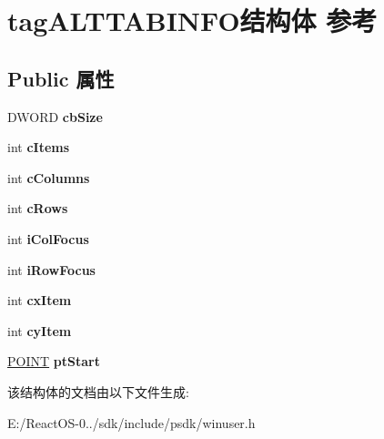 \hypertarget{structtag_a_l_t_t_a_b_i_n_f_o}{}\section{tag\+A\+L\+T\+T\+A\+B\+I\+N\+F\+O结构体 参考}
\label{structtag_a_l_t_t_a_b_i_n_f_o}
\subsection*{Public 属性}
\begin{DoxyCompactItemize}
\item 
\mbox{\label{structtag_a_l_t_t_a_b_i_n_f_o_a15757bfaad41c9460474ffdeecd2b880}} 
D\+W\+O\+RD {\bfseries cb\+Size}
\item 
\mbox{\label{structtag_a_l_t_t_a_b_i_n_f_o_af64a43942f00b733a4ba354e8f5c8d09}} 
int {\bfseries c\+Items}
\item 
\mbox{\label{structtag_a_l_t_t_a_b_i_n_f_o_ac453b47b970fe6569544fc01190fc00d}} 
int {\bfseries c\+Columns}
\item 
\mbox{\label{structtag_a_l_t_t_a_b_i_n_f_o_a4b92607ec1496035b7ec1eb0d0bbde2b}} 
int {\bfseries c\+Rows}
\item 
\mbox{\label{structtag_a_l_t_t_a_b_i_n_f_o_a6517e85ac0afaad55d2fc467a4a57528}} 
int {\bfseries i\+Col\+Focus}
\item 
\mbox{\label{structtag_a_l_t_t_a_b_i_n_f_o_a939a5eab8f1b7c1c14e8ebf315f897f7}} 
int {\bfseries i\+Row\+Focus}
\item 
\mbox{\label{structtag_a_l_t_t_a_b_i_n_f_o_a09aaa02ee3a9e3172059f450a735129c}} 
int {\bfseries cx\+Item}
\item 
\mbox{\label{structtag_a_l_t_t_a_b_i_n_f_o_a25feeda793cd4fea23d679facb3df698}} 
int {\bfseries cy\+Item}
\item 
\mbox{\label{structtag_a_l_t_t_a_b_i_n_f_o_a78ef7dff316ec32b8a57038a5f3e9ada}} 
\hyperlink{structtag_p_o_i_n_t}{P\+O\+I\+NT} {\bfseries pt\+Start}
\end{DoxyCompactItemize}


该结构体的文档由以下文件生成\+:\begin{DoxyCompactItemize}
\item 
E\+:/\+React\+O\+S-\/0../sdk/include/psdk/winuser.\+h\end{DoxyCompactItemize}
